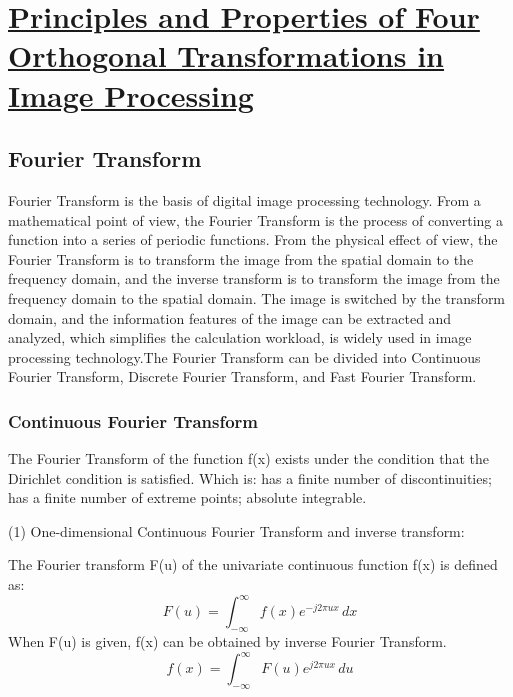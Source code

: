 \chapter{\protect\hyperlink{:}{Principles and Properties of Four Orthogonal Transformations in Image Processing}}
\thispagestyle{fancy} %
\section{Fourier Transform}
Fourier Transform is the basis of digital image processing technology. From a mathematical point of view, the Fourier Transform is the process of converting a function into a series of periodic functions. From the physical effect of view, the Fourier Transform is to transform the image from the spatial domain to the frequency domain, and the inverse transform is to transform the image from the frequency domain to the spatial domain. The image is switched by the transform domain, and the information features of the image can be extracted and analyzed, which simplifies the calculation workload, is widely used in image processing technology.The Fourier Transform can be divided into Continuous Fourier Transform, Discrete Fourier Transform, and Fast Fourier Transform.
\subsection{Continuous Fourier Transform}
The Fourier Transform of the function f(x) exists under the condition that the Dirichlet condition is satisfied. Which is: has a finite number of discontinuities; has a finite number of extreme points; absolute integrable\cite{ref4}.

(1) One-dimensional Continuous Fourier Transform and inverse transform:

The Fourier transform F(u) of the univariate continuous function f(x) is defined as:
\begin{equation}
F(u) = \int_{-\infty}^{\infty} f(x) e^{-j2\pi ux} \, dx
\label{eq:2-1}
\end{equation}
When F(u) is given, f(x) can be obtained by inverse Fourier Transform.
\begin{equation}
f(x) = \int_{-\infty}^{\infty} F(u) e^{j2\pi ux} \, du
\label{eq:2-2}
\end{equation}

